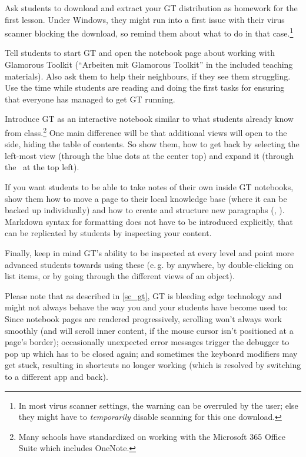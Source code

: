 \begin{instructions}
\item Ask students to download and extract your GT distribution as homework for the first lesson. Under Windows, they might run into a first issue with their virus scanner blocking the download, so remind them about what to do in that case.\footnote{In most virus scanner settings, the warning can be overruled by the user; else they might have to \emph{temporarily} disable scanning for this one download.}
\item Tell students to start GT and open the notebook page about working with Glamorous Toolkit (``Arbeiten mit Glamorous Toolkit'' in the included teaching materials). Also ask them to help their neighbours, if they see them struggling. Use the time while students are reading and doing the first tasks for ensuring that everyone has managed to get GT running.
\item Introduce GT as an interactive notebook similar to what students already know from class.\footnote{Many schools have standardized on working with the Microsoft 365 Office Suite which includes OneNote.} One main difference will be that additional views will open to the side, hiding the table of contents. So show them, how to get back by selecting the left-most view (through the blue dots at the center top) and expand it (through the \faPlusCircle\ at the top left).
\item If you want students to be able to take notes of their own inside GT notebooks, show them how to move a page to their local knowledge base (where it can be backed up individually) and how to create and structure new paragraphs (, ). Markdown syntax for formatting does not have to be introduced explicitly, that can be replicated by students by inspecting your content.
\item Finally, keep in mind GT's ability to be inspected at every level and point more advanced students towards using these (e.\,g. by  anywhere, by double-clicking on list items, or by going through the different views of an object).
\end{instructions}

Please note that as described in \ref{sc_gt}, GT is bleeding edge technology and might not always behave the way you and your students have become used to: Since notebook pages are rendered progressively, scrolling won't always work smoothly (and will scroll inner content, if the mouse cursor isn't positioned at a page's border); occasionally unexpected error messages trigger the debugger to pop up which has to be closed again; and sometimes the keyboard modifiers may get stuck, resulting in shortcuts no longer working (which is resolved by switching to a different app and back).


